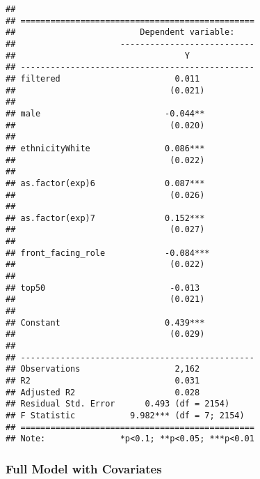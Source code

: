 \documentclass[
]{article}
\begin{document}
\begin{verbatim}
## 
## ===============================================
##                         Dependent variable:    
##                     ---------------------------
##                                  Y             
## -----------------------------------------------
## filtered                       0.011           
##                               (0.021)          
##                                                
## male                         -0.044**          
##                               (0.020)          
##                                                
## ethnicityWhite               0.086***          
##                               (0.022)          
##                                                
## as.factor(exp)6              0.087***          
##                               (0.026)          
##                                                
## as.factor(exp)7              0.152***          
##                               (0.027)          
##                                                
## front_facing_role            -0.084***         
##                               (0.022)          
##                                                
## top50                         -0.013           
##                               (0.021)          
##                                                
## Constant                     0.439***          
##                               (0.029)          
##                                                
## -----------------------------------------------
## Observations                   2,162           
## R2                             0.031           
## Adjusted R2                    0.028           
## Residual Std. Error      0.493 (df = 2154)     
## F Statistic           9.982*** (df = 7; 2154)  
## ===============================================
## Note:               *p<0.1; **p<0.05; ***p<0.01
\end{verbatim}

\hypertarget{full-model-with-covariates}{%
\subsubsection{Full Model with
Covariates}\label{full-model-with-covariates}}
\end{document}
